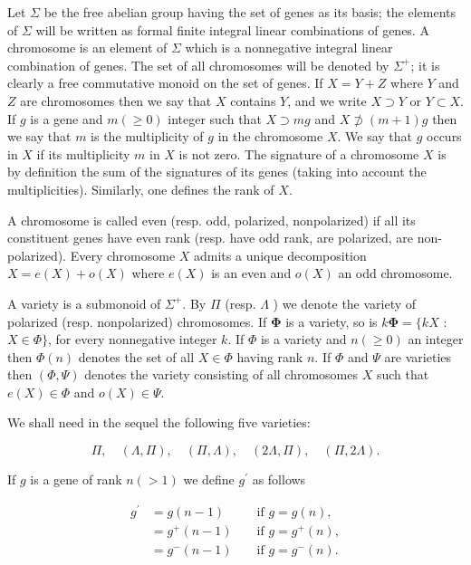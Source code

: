 \documentclass[10pt]{article}
\begin{document}
Let $\Sigma$ be the free abelian group having the set of genes as its basis; the elements of $\Sigma$ will be written as formal finite integral linear combinations of genes. A chromosome is an element of $\Sigma$ which is a nonnegative integral linear combination of genes. The set of all chromosomes will be denoted by $\Sigma^{+}$; it is clearly a free commutative monoid on the set of genes. If $X=Y+Z$ where $Y$ and $Z$ are chromosomes then we say that $X$ contains $Y$, and we write $X \supset Y$ or $Y \subset X$. If $g$ is a gene and $m(\geqslant 0)$ integer such that $X \supset m g$ and $X \not \supset(m+1) g$ then we say that $m$ is the multiplicity of $g$ in the chromosome $X$. We say that $g$ occurs in $X$ if its multiplicity $m$ in $X$ is not zero. The signature of a chromosome $X$ is by definition the sum of the signatures of its genes (taking into account the multiplicities). Similarly, one defines the rank of $X$.

A chromosome is called even (resp. odd, polarized, nonpolarized) if all its constituent genes have even rank (resp. have odd rank, are polarized, are non-polarized). Every chromosome $X$ admits a unique decomposition $X=e(X)+o(X)$ where $e(X)$ is an even and $o(X)$ an odd chromosome.

A variety is a submonoid of $\Sigma^{+}$. By $\Pi$ (resp. $\Lambda$ ) we denote the variety of polarized (resp. nonpolarized) chromosomes. If $\boldsymbol{\Phi}$ is a variety, so is $k \boldsymbol{\Phi}=\{k X$ : $X \in \Phi\}$, for every nonnegative integer $k$. If $\Phi$ is a variety and $n(\geqslant 0)$ an integer then $\Phi(n)$ denotes the set of all $X \in \Phi$ having rank $n$. If $\Phi$ and $\Psi$ are varieties then $(\Phi, \Psi)$ denotes the variety consisting of all chromosomes $X$ such that $e(X) \in \Phi$ and $o(X) \in \Psi$.

We shall need in the sequel the following five varieties:


\begin{equation*}
\Pi, \quad(\Lambda, \Pi), \quad(\Pi, \Lambda), \quad(2 \Lambda, \Pi), \quad(\Pi, 2 \Lambda) . \tag{6.2}
\end{equation*}


If $g$ is a gene of rank $n(>1)$ we define $g^{\prime}$ as follows

$$
\begin{aligned}
g^{\prime} & =g(n-1) & & \text { if } g=g(n), \\
& =g^{+}(n-1) & & \text { if } g=g^{+}(n), \\
& =g^{-}(n-1) & & \text { if } g=g^{-}(n) .
\end{aligned}
$$
\end{document}
